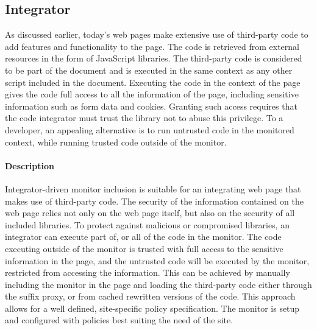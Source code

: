 \documentclass{llncs}
\newcommand{\todo}[1]{\colorbox{red}{\textcolor{white}{\sffamily\bfseries\scriptsize TODO}} \textcolor{red}{#1} \textcolor{red}{$\blacktriangleleft$}}
\begin{document}
\subsection{Integrator}
\label{sec:arch-integrator}

As discussed earlier, today's
 web pages make extensive use of third-party code to add features 
and functionality to the page. The code is retrieved from external resources in 
the form of JavaScript libraries. The third-party code is considered to be part 
of the document and is executed in the same context as any other script 
included in the document. Executing the code in the context of the page gives the code full access to all the information 
of the page, including sensitive information such as form data and cookies. 
Granting such access requires that the code integrator must 
trust the library not to abuse this privilege. To a developer, an appealing alternative 
is to run untrusted code in the monitored context, while running trusted code outside of the 
monitor. 

\paragraph{Description}
Integrator-driven monitor inclusion is suitable for an integrating web page 
that makes use of third-party code.
The security of the information contained on the web 
page relies not only on the web page itself, but also on the security of all 
included libraries. To protect against malicious or compromised libraries, 
an integrator can execute part of, or all of the code in the monitor.
The code executing outside of the monitor is trusted with full access to the 
sensitive information in the page, and the untrusted code will be executed 
by the monitor, restricted from accessing the information.
This can be achieved by manually including the monitor in the page and loading the 
third-party code either through the suffix proxy, or from cached rewritten 
versions of the code. %
This approach allows for a well defined, site-specific policy specification.
The monitor is setup and configured with policies best suiting the need of the 
site. 
\end{document}
